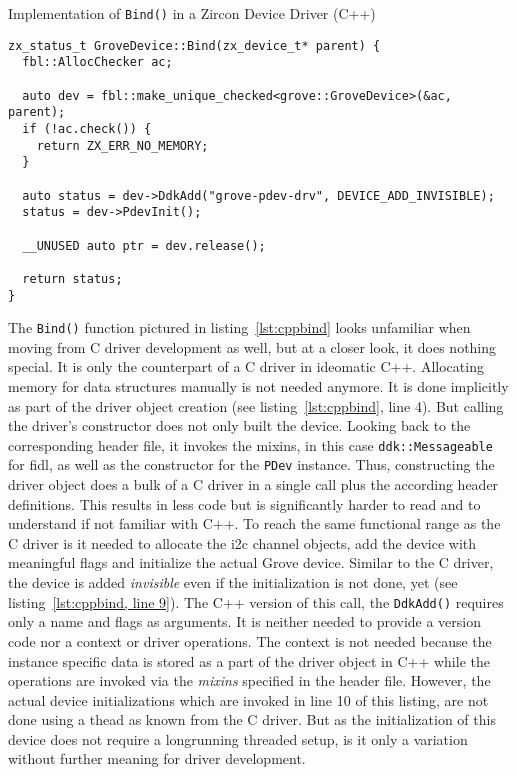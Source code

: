 \begin{listing} [H]
    \caption{Implementation of \texttt{Bind()} in a Zircon Device Driver (C++)}
\label{lst:cppbind}
\begin{verbatim}
zx_status_t GroveDevice::Bind(zx_device_t* parent) {
  fbl::AllocChecker ac;

  auto dev = fbl::make_unique_checked<grove::GroveDevice>(&ac, parent);
  if (!ac.check()) {
    return ZX_ERR_NO_MEMORY;
  }

  auto status = dev->DdkAdd("grove-pdev-drv", DEVICE_ADD_INVISIBLE);
  status = dev->PdevInit();

  __UNUSED auto ptr = dev.release();

  return status;
}
\end{verbatim}
\end{listing}

The \texttt{Bind()} function pictured in listing~\ref{lst:cppbind} looks unfamiliar when moving from C driver development as well, but at a closer look, it does nothing special.
It is only the counterpart of a C driver in ideomatic C++.
Allocating memory for data structures manually is not needed anymore.
It is done implicitly as part of the driver object creation (see listing~\ref{lst:cppbind}, line 4).
But calling the driver's constructor does not only built the device.
Looking back to the corresponding header file, it invokes the mixins, in this case \texttt{ddk::Messageable} for \ac{fidl}, as well as the constructor for the \texttt{PDev} instance.
Thus, constructing the driver object does a bulk of a C driver in a single call plus the according header definitions.
This results in less code but is significantly harder to read and to understand if not familiar with C++.
To reach the same functional range as the C driver is it needed to allocate the \ac{i2c} channel objects, add the device with meaningful flags and initialize the actual Grove device.
Similar to the C driver, the device is added \textit{invisible} even if the initialization is not done, yet (see listing~\ref{lst:cppbind, line 9}).
The C++ version of this call, the \texttt{DdkAdd()} requires only a name and flags as arguments.
It is neither needed to provide a version code nor a context or driver operations.
The context is not needed because the instance specific data is stored as a part of the driver object in C++ while the operations are invoked via the \textit{mixins} specified in the header file.
However, the actual device initializations which are invoked in line 10 of this listing, are not done using a thead as known from the C driver.
But as the initialization of this device does not require a longrunning threaded setup, is it only a variation without further meaning for driver development. 

